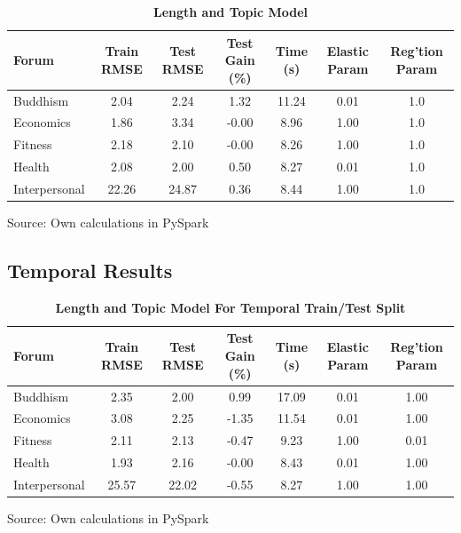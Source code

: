 \documentclass[11pt,preprint, authoryear]{article}
\numberwithin{equation}{section}
\begin{document}
\begin{longtable}[htbp] {@{} lcccccc @{}} 
\caption{\textbf{Length and Topic Model}} 
\label{tab:rand_final_model} \\
\toprule
\textbf{Forum} &  \textbf{Train RMSE} &  \textbf{Test RMSE} &  \textbf{Test Gain (\%)} &  \textbf{Time (s)} & \textbf{Elastic Param} &  \textbf{Reg'tion Param} \\
\midrule
Buddhism      &             2.04 &          2.24 &           1.32 &          11.24 &             0.01 &              1.0 \\
Economics     &             1.86 &          3.34 &          -0.00 &           8.96 &             1.00 &              1.0 \\
Fitness       &             2.18 &          2.10 &          -0.00 &           8.26 &             1.00 &              1.0 \\
Health        &             2.08 &          2.00 &           0.50 &           8.27 &             0.01 &              1.0 \\
Interpersonal &            22.26 &         24.87 &           0.36 &           8.44 &             1.00 &              1.0 \\
\bottomrule
\end{longtable}\begin{center} Source: Own calculations in PySpark\end{center}

\normalsize

\subsection{Temporal Results}\label{temporal-results}

\footnotesize

\begin{longtable}[htbp] {@{} lcccccc @{}} 
\caption{\textbf{Length and Topic Model For Temporal Train/Test Split}} 
\label{tab:time_token_model} \\
\toprule
\textbf{Forum} &  \textbf{Train RMSE} &  \textbf{Test RMSE} &  \textbf{Test Gain (\%)} &  \textbf{Time (s)} & \textbf{Elastic Param} &  \textbf{Reg'tion Param} \\
\midrule
Buddhism      &             2.35 &          2.00 &           0.99 &          17.09 &             0.01 &             1.00 \\
Economics     &             3.08 &          2.25 &          -1.35 &          11.54 &             0.01 &             1.00 \\
Fitness       &             2.11 &          2.13 &          -0.47 &           9.23 &             1.00 &             0.01 \\
Health        &             1.93 &          2.16 &          -0.00 &           8.43 &             0.01 &             1.00 \\
Interpersonal &            25.57 &         22.02 &          -0.55 &           8.27 &             1.00 &             1.00 \\
\bottomrule
\end{longtable}\begin{center} Source: Own calculations in PySpark\end{center}
\end{document}
